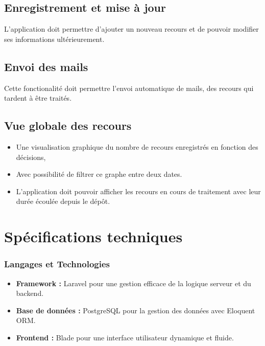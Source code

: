 \subsection{Enregistrement et mise à jour}
   L'application doit permettre d'ajouter un nouveau recours et de pouvoir modifier ses informations ultérieurement.
\subsection{Envoi des mails}
   Cette fonctionalité doit permettre l'envoi automatique de mails, des recours qui tardent à être traités.
\subsection{Vue globale des recours}
\begin{itemize}
   \item Une visualisation graphique du nombre de recours enregistrés en fonction des décisions,
   \item Avec possibilité de filtrer ce graphe entre deux dates.
   \item L'application doit pouvoir afficher les recours en cours de traitement avec leur durée écoulée depuis le dépôt.
\end{itemize}



\section{Spécifications techniques}

\subsubsection{Langages et Technologies}
\begin{itemize}
    \item \textbf{Framework :} Laravel pour une gestion efficace de la logique serveur et du backend.
    \item \textbf{Base de données :} PostgreSQL pour la gestion des données avec Eloquent ORM.
    \item \textbf{Frontend :} Blade pour une interface utilisateur dynamique et fluide.

\end{itemize}



